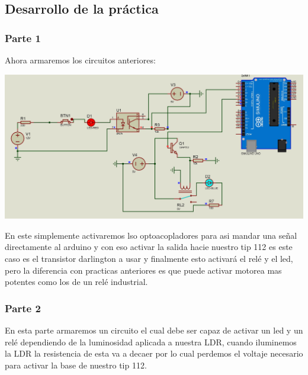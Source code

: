 \documentclass[12pt,a4paper]{article}
\begin{document}
\begin{flushleft}
\begin{center}
\subsection{Desarrollo de la práctica}
\end{center}
\subsubsection{Parte 1}
Ahora armaremos los circuitos anteriores: \linebreak
\begin{center}
\includegraphics[scale=0.1]{imagenes/circuito.JPG} \linebreak

\end{center}
En este simplemente activaremos lso optoacopladores para asi mandar una señal directamente al arduino y con eso activar la salida hacie nuestro tip 112 es este caso es el transistor darlington a usar y finalmente esto activará el relé y el led, pero la diferencia con practicas anteriores es que puede activar motorea mas potentes como los de un relé industrial.\linebreak

\subsubsection{Parte 2}
En esta parte armaremos un circuito el cual debe ser capaz de activar un led y un relé dependiendo de la luminosidad aplicada a nuestra LDR, cuando iluminemos la LDR la resistencia de esta va a decaer por lo cual perdemos el voltaje necesario para activar la base de nuestro tip 112.\linebreak


\end{flushleft}
\end{document}
